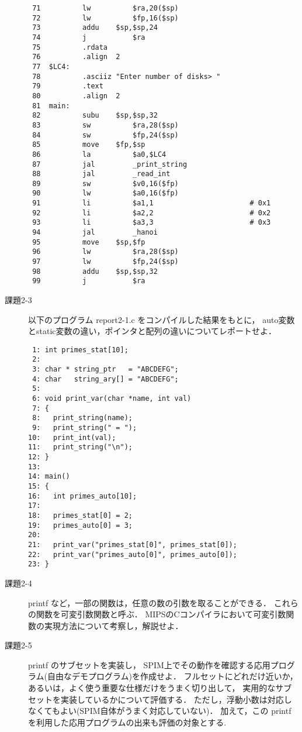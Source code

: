 \documentclass[a4j,11pt]{jarticle}
\begin{document}
\begin{description}
\begin{verbatim}
 71          lw          $ra,20($sp)
 72          lw          $fp,16($sp)
 73          addu    $sp,$sp,24
 74          j           $ra
 75          .rdata
 76          .align  2
 77  $LC4:
 78          .asciiz "Enter number of disks> "
 79          .text
 80          .align  2
 81  main:
 82          subu    $sp,$sp,32
 83          sw          $ra,28($sp)
 84          sw          $fp,24($sp)
 85          move    $fp,$sp
 86          la          $a0,$LC4
 87          jal         _print_string
 88          jal         _read_int
 89          sw          $v0,16($fp)
 90          lw          $a0,16($fp)
 91          li          $a1,1                       # 0x1
 92          li          $a2,2                       # 0x2
 93          li          $a3,3                       # 0x3
 94          jal         _hanoi
 95          move    $sp,$fp
 96          lw          $ra,28($sp)
 97          lw          $fp,24($sp)
 98          addu    $sp,$sp,32
 99          j           $ra
\end{verbatim}

\item[課題2-3]以下のプログラム report2-1.c をコンパイルした結果をもとに， auto変数とstatic変数の違い，ポインタと配列の違いについてレポートせよ．
\begin{verbatim}
 1: int primes_stat[10];
 2: 
 3: char * string_ptr   = "ABCDEFG";
 4: char   string_ary[] = "ABCDEFG";
 5: 
 6: void print_var(char *name, int val)
 7: {
 8:   print_string(name);
 9:   print_string(" = ");
10:   print_int(val);
11:   print_string("\n");
12: }
13: 
14: main()
15: {
16:   int primes_auto[10];
17: 
18:   primes_stat[0] = 2;
19:   primes_auto[0] = 3;
20: 
21:   print_var("primes_stat[0]", primes_stat[0]);
22:   print_var("primes_auto[0]", primes_auto[0]);
23: }
\end{verbatim}

\item[課題2-4]printf など，一部の関数は，任意の数の引数を取ることができる． これらの関数を可変引数関数と呼ぶ． MIPSのCコンパイラにおいて可変引数関数の実現方法について考察し，解説せよ．

\item[課題2-5]printf のサブセットを実装し， SPIM上でその動作を確認する応用プログラム(自由なデモプログラム)を作成せよ． フルセットにどれだけ近いか，あるいは，よく使う重要な仕様だけをうまく切り出して， 実用的なサブセットを実装しているかについて評価する． ただし，浮動小数は対応しなくてもよい(SPIM自体がうまく対応していない)． 加えて，この printf を利用した応用プログラムの出来も評価の対象とする.

\end{description}
\end{document}
